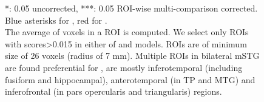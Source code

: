 \begin{figure}
    \centering
    \caption[  ROI Contrast, Group]{*: 0.05 uncorrected, ***: 0.05 ROI-wise multi-comparison corrected. Blue asterisks for , red for .\\ The average  of voxels in a ROI is computed. We select only ROIs with scores>0.015 in either of  and  models. ROIs are of minimum size of 26 voxels (radius of 7 mm). Multiple ROIs in bilateral mSTG are found preferential for ,  are mostly inferotemporal (including fusiform and hippocampal), anterotemporal (in TP and MTG) and inferofrontal (in pars opercularis and triangularis) regions.} 
    \label{fig:SIG_ASN_ROI}
\end{figure}
